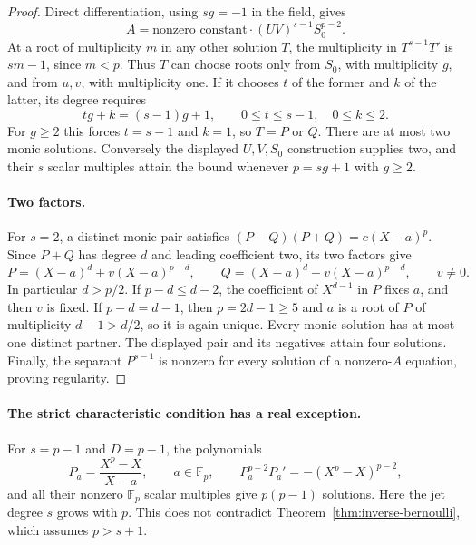 \begin{proof}
Direct differentiation, using $sg=-1$ in the field, gives
\[
 A=\text{nonzero constant}\cdot (UV)^{s-1}S_0^{p-2}.
\]
At a root of multiplicity $m$ in any other solution $T$, the
multiplicity in $T^{s-1}T'$ is $sm-1$, since $m<p$.
Thus $T$ can choose roots only from $S_0$, with multiplicity $g$,
and from $u,v$, with multiplicity one. If it chooses $t$ of the
former and $k$ of the latter, its degree requires
\[
 tg+k=(s-1)g+1,\qquad 0\le t\le s-1,\quad0\le k\le2.
\]
For $g\ge2$ this forces $t=s-1$ and $k=1$, so $T=P$ or $Q$.
There are at most two monic solutions. Conversely the displayed
$U,V,S_0$ construction supplies two, and their $s$ scalar multiples
attain the bound whenever $p=sg+1$ with $g\ge2$.

\paragraph{Two factors.}
For $s=2$, a distinct monic pair satisfies
$(P-Q)(P+Q)=c(X-a)^p$. Since $P+Q$ has degree $d$ and leading
coefficient two, its two factors give
\[
 P=(X-a)^d+v(X-a)^{p-d},\qquad
 Q=(X-a)^d-v(X-a)^{p-d},\qquad v\ne0.
\]
In particular $d>p/2$. If $p-d\le d-2$, the coefficient of
$X^{d-1}$ in $P$ fixes $a$, and then $v$ is fixed. If $p-d=d-1$,
then $p=2d-1\ge5$ and $a$ is a root of $P$ of multiplicity
$d-1>d/2$, so it is again unique. Every monic solution has at most
one distinct partner. The displayed pair and its negatives attain
four solutions. Finally, the separant $P^{s-1}$ is nonzero for
every solution of a nonzero-$A$ equation, proving regularity.
\end{proof}

\paragraph{The strict characteristic condition has a real exception.}
For $s=p-1$ and $D=p-1$, the polynomials
\[
 P_a=\frac{X^p-X}{X-a},\qquad a\in\mathbb F_p,
 \qquad P_a^{p-2}P_a'=-(X^p-X)^{p-2},
\]
and all their nonzero $\mathbb F_p$ scalar multiples give $p(p-1)$
solutions. Here the jet degree $s$ grows with $p$. This does not
contradict Theorem~\ref{thm:inverse-bernoulli}, which assumes $p>s+1$.

